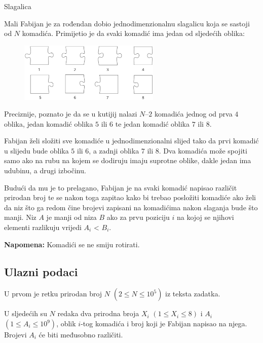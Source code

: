 \begin{statement}[
  problempoints=70,
  timelimit=1 sekunda,
  memorylimit=512 MiB,
]{Slagalica}

Mali Fabijan je za rođendan dobio jednodimenzionalnu slagalicu koja se sastoji
od $N$ komadića. Primijetio je da svaki komadić ima jedan od sljedećih oblika:

\begin{figure}[H]
\centering
\includegraphics[width=0.6\textwidth]{img/puzzledef.png}
\end{figure}

Preciznije, poznato je da se u kutijij nalazi $N–2$ komadića jednog od prva $4$
oblika, jedan komadić oblika $5$ ili $6$ te jedan komadić oblika $7$ ili $8$.

Fabijan želi složiti sve komadiće u jednodimenzionalni slijed tako da prvi
komadić u slijedu bude oblika $5$ ili $6$, a zadnji oblika $7$ ili $8$.
Dva komadića može spojiti samo ako na rubu na kojem se dodiruju imaju suprotne
oblike, dakle jedan ima udubinu, a drugi izbočinu.

Budući da mu je to prelagano, Fabijan je na svaki komadić napisao različit
prirodan broj te se nakon toga zapitao kako bi trebao posložiti komadiće ako
želi da niz što ga redom čine brojevi zapisani na komadićima nakon slaganja bude
što manji. Niz $A$ je manji od niza $B$ ako za prvu poziciju $i$ na kojoj se
njihovi elementi razlikuju vrijedi $A_i$ < $B_i$.

\textbf{Napomena:} Komadići se ne smiju rotirati.

\subsection*{Ulazni podaci}
U prvom je retku prirodan broj $N$ $(2 \le N \le 10^5)$ iz teksta zadatka.

U sljedećih su $N$ redaka dva prirodna broja $X_i$ $(1 \le X_i \le 8)$ i $A_i$
$(1 \le A_i \le 10^9)$, oblik $i$-tog komadića i broj koji je Fabijan napisao na
njega. Brojevi $A_i$ će biti međusobno različiti.


\end{statement}
